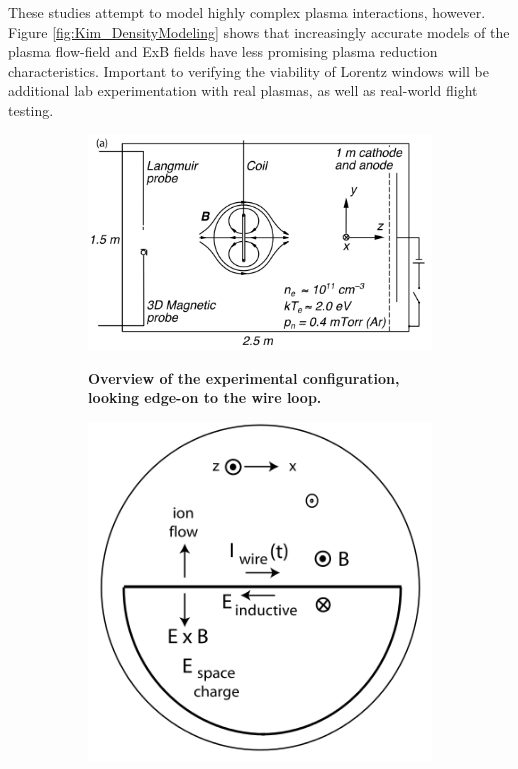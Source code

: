 \documentclass[twocolumn]{article}
\begin{document}
			
			
			These studies attempt to model highly complex plasma interactions, however.
			Figure \ref{fig:Kim_DensityModeling} shows that increasingly accurate models of the plasma flow-field and ExB fields have less promising plasma reduction characteristics.
			Important to verifying the viability of Lorentz windows will be additional lab experimentation with real plasmas, as well as real-world flight testing.
			

			
			\begin{figure}[!ht]
				\centering
				\begin{subfigure}{0.5\textwidth}
					\centering
					\includegraphics[width=1.0\textwidth]{Images/Stenzel_ExperimentConfig1}
					\label{fig:Stenzel_ExperimentConfig1}
					\caption{\textbf{Overview of the experimental configuration, looking edge-on to the wire loop.}}
				\end{subfigure}%
				\begin{subfigure}{0.5\textwidth}
					\centering
					\includegraphics[width=1.0\textwidth]{Images/Stenzel_ExperimentConfig2}

\end{subfigure}
\end{figure}
\end{document}
